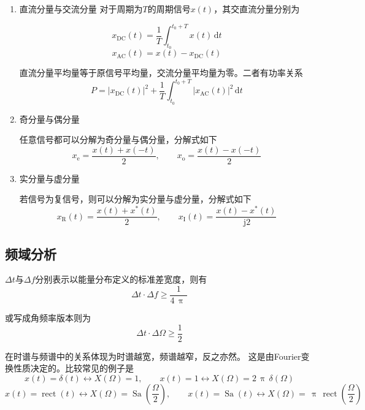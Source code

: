 \documentclass[UTF8,fontset=fandol,zihao=5]{ctexart}
\newcommand{\jj}{\,\mathrm{j}}
\newcommand{\dd}{\,\mathrm{d}}
\newcommand{\ppi}{\,\uppi\,}
\begin{document}
\begin{enumerate}

  \item 直流分量与交流分量
  对于周期为$T$的周期信号$x(t)$，其交直流分量分别为
  
  \[
  x_\mathrm{DC}(t) = \frac{1}{T} \int_{t_0}^{t_0+T} x(t) \dd t
  \]
  \[
  x_\mathrm{AC}(t) = x(t) - x_\mathrm{DC}(t)
  \]

  直流分量平均量等于原信号平均量，交流分量平均量为零。二者有功率关系
  \[
  P=\left | x_\mathrm{DC}(t) \right |^2 + \frac{1}{T} \int_{t_0}^{t_0+T} \left | x_\mathrm{AC}(t) \right |^2 \dd t
  \]

  \item 奇分量与偶分量
  
  任意信号都可以分解为奇分量与偶分量，分解式如下
  \[
  x_\mathrm{e} = \frac{x(t) + x(-t)}{2}
  ,\qquad
  x_\mathrm{o} = \frac{x(t) - x(-t)}{2}
  \]

  \item 实分量与虚分量
  
  若信号为复信号，则可以分解为实分量与虚分量，分解式如下
  \[
  x_\mathrm{R}(t)=\dfrac{x(t)+x^\ast(t)}{2}
  ,\qquad
  x_\mathrm{I}(t)=\dfrac{x(t)-x^\ast(t)}{\jj 2}
  \]

\end{enumerate}

\subsection{频域分析}

\begin{methodbox}[时频不确定性原理]

  $\Delta t$与$\Delta f$分别表示以能量分布定义的标准差宽度，则有
  \[
    \Delta t \cdot \Delta f \geq \frac{1}{4\ppi}
  \]

  或写成角频率版本则为
  \[
    \Delta t \cdot \Delta \varOmega \geq \frac12
  \]

  在时谱与频谱中的关系体现为时谱越宽，频谱越窄，反之亦然。
  这是由Fourier变换性质决定的。比较常见的例子是
  \[
  x(t)=\delta (t) \leftrightarrow X(\varOmega)=1, \qquad x(t)=1 \leftrightarrow X(\varOmega)=2\ppi \delta (\varOmega)
  \]
  \[
  x(t)=\operatorname{rect}(t) \leftrightarrow X(\varOmega)=\operatorname{Sa}\left (\dfrac{\varOmega}{2}\right ) , \qquad x(t)= \operatorname{Sa}(t) \leftrightarrow X(\varOmega)=\ppi \operatorname{rect}(\dfrac{\varOmega}{2})
  \]

\end{methodbox}
\end{document}

